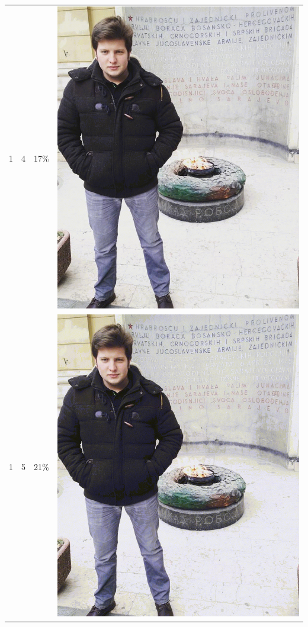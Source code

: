 \documentclass[times, utf8, seminar, numeric]{fer}
\begin{document}
\begin{center}
\begin{longtable}{|c|c|c|c|}
1 & 4 &17\% & \includegraphics[scale=0.3]{../benchmark_results/pattern/1_components-4_bits.png} \\
1 & 5 &21\% & \includegraphics[scale=0.3]{../benchmark_results/pattern/1_components-5_bits.png} \\

\end{longtable}
\end{center}
\end{document}
